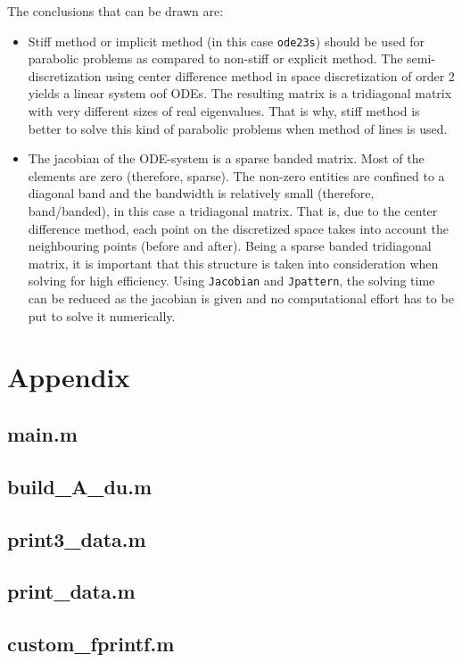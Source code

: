 \documentclass{article}
\begin{document}
The conclusions that can be drawn are:
\begin{itemize}
    \item Stiff method or implicit method (in this case \texttt{ode23s})
      should be used for parabolic problems as compared to non-stiff or
      explicit method. The semi-discretization using center difference method
      in space discretization of order 2 yields a linear system oof ODEs. The
      resulting matrix is a tridiagonal matrix with very different sizes of
      real eigenvalues. That is why, stiff method is better to solve this kind
      of parabolic problems when method of lines is used.
      
    \item The jacobian of the ODE-system is a sparse banded matrix. Most of
      the elements are zero (therefore, sparse). The non-zero entities are
      confined to a diagonal band and the bandwidth is relatively small
      (therefore, band/banded), in this case a tridiagonal matrix. That is,
      due to the center difference method, each point on the discretized space
      takes into account the neighbouring points (before and after). Being a
      sparse banded tridiagonal matrix, it is important that this structure is
      taken into consideration when solving for high efficiency. Using
      \texttt{Jacobian} and \texttt{Jpattern}, the solving time can be reduced
      as the jacobian is given and no computational effort has to be put to
      solve it numerically. 
\end{itemize}

\section{Appendix}

\subsection{main.m}

\subsection{build\_A\_du.m}

\subsection{print3\_data.m}

\subsection{print\_data.m}

\subsection{custom\_fprintf.m}

\end{document}
